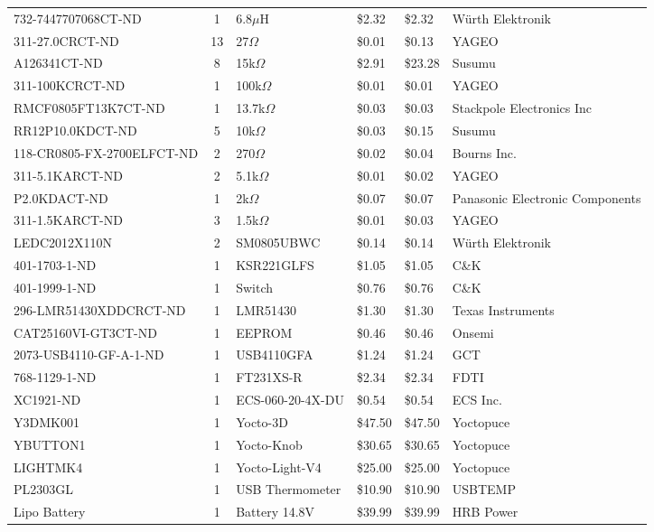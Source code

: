 \documentclass[../main.tex]{subfiles}
\begin{document}
\begin{longtable}{|p{5cm}|c|p{3cm}|p{1.2cm}|p{1.2cm}|p{5cm}|}
732-7447707068CT-ND & 1 & 6.8$\mu$H & \$2.32 & \$2.32 & Würth Elektronik \\
311-27.0CRCT-ND & 13 & 27$\Omega$ & \$0.01 & \$0.13 & YAGEO \\
A126341CT-ND & 8 & 15k$\Omega$ & \$2.91 & \$23.28 & Susumu \\
311-100KCRCT-ND & 1 & 100k$\Omega$ & \$0.01 & \$0.01 & YAGEO \\
RMCF0805FT13K7CT-ND & 1 & 13.7k$\Omega$ & \$0.03 & \$0.03 & Stackpole Electronics Inc \\
RR12P10.0KDCT-ND & 5 & 10k$\Omega$ & \$0.03 & \$0.15 & Susumu \\
118-CR0805-FX-2700ELFCT-ND & 2 & 270$\Omega$ & \$0.02 & \$0.04 & Bourns Inc. \\
311-5.1KARCT-ND & 2 & 5.1k$\Omega$ & \$0.01 & \$0.02 & YAGEO \\
P2.0KDACT-ND & 1 & 2k$\Omega$ & \$0.07 & \$0.07 & Panasonic Electronic Components \\
311-1.5KARCT-ND & 3 & 1.5k$\Omega$ & \$0.01 & \$0.03 & YAGEO \\
LEDC2012X110N & 2 & SM0805UBWC & \$0.14 & \$0.14 & Würth Elektronik \\
401-1703-1-ND & 1 & KSR221GLFS & \$1.05 & \$1.05 & C\&K \\
401-1999-1-ND & 1 & Switch & \$0.76 & \$0.76 & C\&K \\
296-LMR51430XDDCRCT-ND & 1 & LMR51430 & \$1.30 & \$1.30 & Texas Instruments \\
CAT25160VI-GT3CT-ND & 1 & EEPROM & \$0.46 & \$0.46 & Onsemi \\
2073-USB4110-GF-A-1-ND & 1 & USB4110GFA & \$1.24 & \$1.24 & GCT \\
768-1129-1-ND & 1 & FT231XS-R & \$2.34 & \$2.34 & FDTI \\
XC1921-ND & 1 & ECS-060-20-4X-DU & \$0.54 & \$0.54 & ECS Inc. \\
Y3DMK001 & 1 & Yocto-3D & \$47.50 & \$47.50 & Yoctopuce \\
YBUTTON1 & 1 & Yocto-Knob & \$30.65 & \$30.65 & Yoctopuce \\
LIGHTMK4 & 1 & Yocto-Light-V4 & \$25.00 & \$25.00 & Yoctopuce \\
PL2303GL & 1 & USB Thermometer & \$10.90 & \$10.90 & USBTEMP \\
Lipo Battery & 1 & Battery 14.8V & \$39.99 & \$39.99 & HRB Power \\
\hline
\end{longtable}
\end{document}
